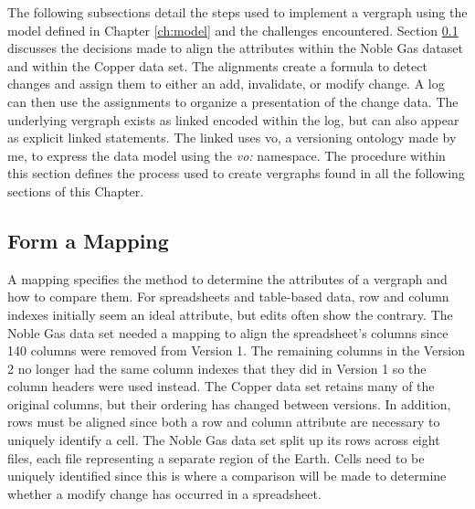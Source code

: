 The following subsections detail the steps used to implement a \gls{vergraph} using the model defined in Chapter \ref{ch:model} and the challenges encountered.
Section \ref{mapping} discusses the decisions made to align the \glspl{attribute} within the Noble Gas dataset and within the Copper data set.
The alignments create a formula to detect changes and assign them to either an \gls{add}, \gls{invalidate}, or \gls{modify} \gls{change}.
A \gls{log} can then use the assignments to organize a presentation of the change data.
The underlying \gls{vergraph} exists as \gls{linked} encoded within the \gls{log}, but can also appear as explicit \gls{linked} statements.
The \gls{linked} uses \gls{vo}, a versioning ontology made by me, to express the data model using the \textit{vo:} namespace.
The procedure within this section defines the process used to create \glspl{vergraph} found in all the following sections of this Chapter.

\subsection{Form a Mapping} \label{mapping}

A mapping specifies the method to determine the \glspl{attribute} of a \gls{vergraph} and how to compare them.
For spreadsheets and table-based data, row and column indexes initially seem an ideal \gls{attribute}, but edits often show the contrary.
The Noble Gas data set needed a mapping to align the spreadsheet's columns since 140 columns were removed from Version 1.
The remaining columns in the Version 2 no longer had the same column indexes that they did in Version 1 so the column headers were used instead.
The Copper data set retains many of the original columns, but their ordering has changed between \glspl{version}.
In addition, rows must be aligned since both a row and column \gls{attribute} are necessary to uniquely identify a cell.
The Noble Gas data set split up its rows across eight files, each file representing a separate region of the Earth.
Cells need to be uniquely identified since this is where a comparison will be made to determine whether a \gls{modify} \gls{change} has occurred in a spreadsheet.

